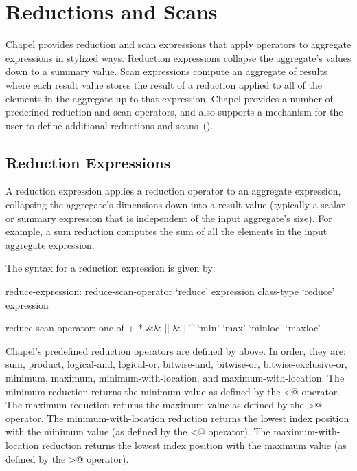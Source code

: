\section{Reductions and Scans}
\label{Reductions_and_Scans}

Chapel provides reduction and scan expressions that apply operators to
aggregate expressions in stylized ways.  Reduction expressions
collapse the aggregate's values down to a summary value.  Scan
expressions compute an aggregate of results where each result value
stores the result of a reduction applied to all of the elements in the
aggregate up to that expression.  Chapel provides a number of predefined
reduction and scan operators, and also supports a mechanism for the
user to define additional reductions and
scans~().

\subsection{Reduction Expressions}
\label{reduce}

A reduction expression applies a reduction operator to an aggregate
expression, collapsing the aggregate's dimensions down into a result
value (typically a scalar or summary expression that is independent of
the input aggregate's size).  For example, a sum reduction computes
the sum of all the elements in the input aggregate expression.

The syntax for a reduction expression is given by:
\begin{syntax}
reduce-expression:
  reduce-scan-operator `reduce' expression
  class-type `reduce' expression

reduce-scan-operator: one of
  + * && || & | ^ `min' `max' `minloc' `maxloc'
\end{syntax}

Chapel's predefined reduction operators are defined
by  above.  In order, they are: sum,
product, logical-and, logical-or, bitwise-and, bitwise-or,
bitwise-exclusive-or, minimum, maximum, minimum-with-location, and
maximum-with-location.  The minimum reduction returns the minimum
value as defined by the \verb@<@ operator.  The maximum reduction
returns the maximum value as defined by the \verb@>@ operator.  The
minimum-with-location reduction returns the lowest index position with
the minimum value (as defined by the \verb@<@ operator).  The
maximum-with-location reduction returns the lowest index position with
the maximum value (as defined by the \verb@>@ operator).

